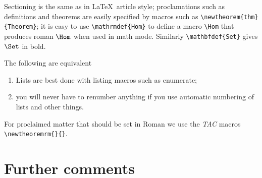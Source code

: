\documentclass{tac}
\let\pf\proof
\let\epf\endproof
\begin{document}
\pf
Sectioning is the same as in \LaTeX\ article style;
proclamations such as definitions and theorems are easily specified
by macros such as \verb.\newtheorem{thm}{Theorem}.;
it is easy to use \verb.\mathrmdef{Hom}. to define a macro \verb.\Hom. that produces
roman $\Hom$ when used in math mode.  Similarly \verb.\mathbfdef{Set}. gives $\Set$
in bold.
\epf


\label{thm-Lamport-1986}  The following are equivalent
\begin{enumerate}
\item Lists are best done with listing macros such as enumerate;

\item you will never have to renumber anything if you use automatic
numbering of lists and other things.
\end{enumerate}

\epf\endthm

\begin{rem}\label{rem-about-roman}
For proclaimed matter that should be set in Roman we use the {\sl TAC} macros \verb.\newtheoremrm{}{}..
\end{rem}

\section{Further comments}\label{sec-Further-comments}
\end{document}
